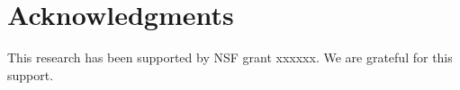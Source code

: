 \documentclass{TeXstyles/DARS/svmult}  %
\begin{document}
\section*{Acknowledgments}
This research has been supported by NSF grant xxxxxx. We are grateful for this support.


\end{document}
